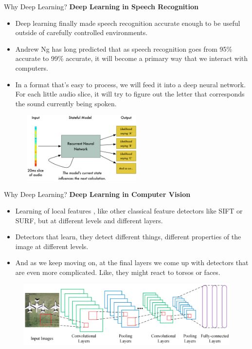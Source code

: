\documentclass[10pt]{beamer}
\begin{document}
	\begin{frame}[c]{Why Deep Learning?}
		\textbf{Deep Learning in Speech Recognition}
		\begin{itemize}
			\item Deep learning finally made speech recognition accurate enough to be useful outside of carefully controlled environments.
			\item Andrew Ng has long predicted that as speech recognition goes from 95\% accurate to 99\%
			accurate, it will become a primary way that we interact with computers.
			\item In a format that’s easy to process, we will feed it into a deep neural network. For each little audio slice, it will try to figure out the letter that corresponds the sound currently being spoken.
		\end{itemize}
		\begin{figure}
			\includegraphics[width=2.5in,height=1.4in]{images/sr}
		\end{figure}
	\end{frame}
	\begin{frame}[c]{Why Deep Learning?}
		\textbf{Deep Learning in Computer Vision}
		\begin{itemize}
			\item Learning of local features , like other classical feature detectors like SIFT or SURF, but at different levels and different layers.
			\item Detectors that learn, they detect different things, different properties of the image at different levels.
			\item And as we keep moving on, at the final layers we come up with detectors that are even more
			complicated. Like, they might react to torsos or faces.
		\end{itemize}
		\begin{figure}
			\includegraphics[width=\linewidth]{images/cv}
		\end{figure}
	\end{frame}
\end{document}
